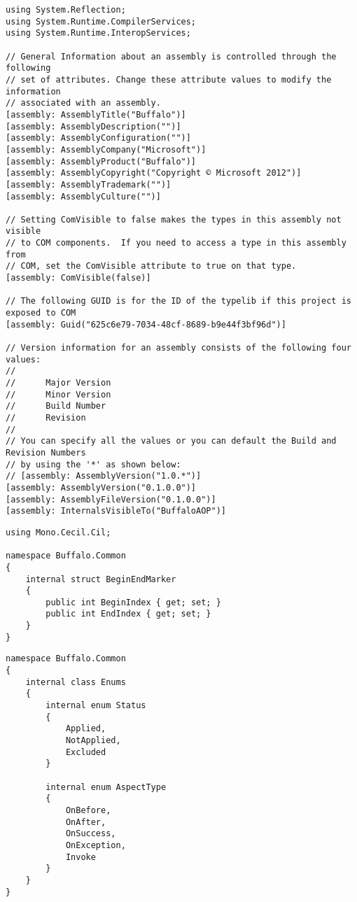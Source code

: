 \begin{lstlisting}[caption={../buffalo/Properties/AssemblyInfo.cs}, label=../buffalo/Properties/AssemblyInfo.cs, frame=tb, basicstyle=\scriptsize]﻿using System.Reflection;
using System.Runtime.CompilerServices;
using System.Runtime.InteropServices;

// General Information about an assembly is controlled through the following 
// set of attributes. Change these attribute values to modify the information
// associated with an assembly.
[assembly: AssemblyTitle("Buffalo")]
[assembly: AssemblyDescription("")]
[assembly: AssemblyConfiguration("")]
[assembly: AssemblyCompany("Microsoft")]
[assembly: AssemblyProduct("Buffalo")]
[assembly: AssemblyCopyright("Copyright © Microsoft 2012")]
[assembly: AssemblyTrademark("")]
[assembly: AssemblyCulture("")]

// Setting ComVisible to false makes the types in this assembly not visible 
// to COM components.  If you need to access a type in this assembly from 
// COM, set the ComVisible attribute to true on that type.
[assembly: ComVisible(false)]

// The following GUID is for the ID of the typelib if this project is exposed to COM
[assembly: Guid("625c6e79-7034-48cf-8689-b9e44f3bf96d")]

// Version information for an assembly consists of the following four values:
//
//      Major Version
//      Minor Version 
//      Build Number
//      Revision
//
// You can specify all the values or you can default the Build and Revision Numbers 
// by using the '*' as shown below:
// [assembly: AssemblyVersion("1.0.*")]
[assembly: AssemblyVersion("0.1.0.0")]
[assembly: AssemblyFileVersion("0.1.0.0")]
[assembly: InternalsVisibleTo("BuffaloAOP")]\end{lstlisting}

\begin{lstlisting}[caption={../buffalo/Common/BeginEndMarker.cs}, label=../buffalo/Common/BeginEndMarker.cs, frame=tb, basicstyle=\scriptsize]﻿using Mono.Cecil.Cil;

namespace Buffalo.Common
{
    internal struct BeginEndMarker
    {
        public int BeginIndex { get; set; }
        public int EndIndex { get; set; }
    }
}
\end{lstlisting}

\begin{lstlisting}[caption={../buffalo/Common/Enums.cs}, label=../buffalo/Common/Enums.cs, frame=tb, basicstyle=\scriptsize]﻿namespace Buffalo.Common
{
    internal class Enums
    {
        internal enum Status
        {
            Applied,
            NotApplied,
            Excluded
        }

        internal enum AspectType
        {
            OnBefore,
            OnAfter,
            OnSuccess,
            OnException,
            Invoke
        }
    }
}
\end{lstlisting}


